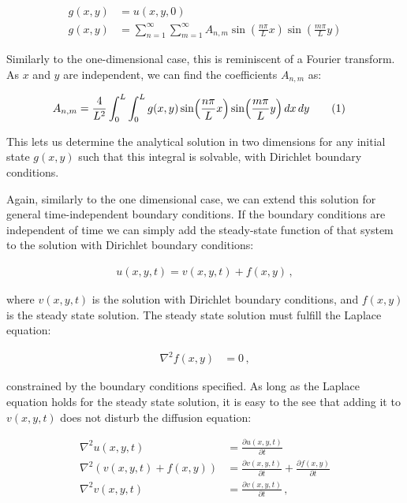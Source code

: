 \documentclass[reprint,english,notitlepage]{revtex4-1}  %
\newcommand\numberthis{\addtocounter{equation}{1}\tag{\theequation}}
\begin{document}
\begin{align*}
g(x,y) &= u(x,y,0) \\
g(x,y) &= \sum\limits_{n=1}^\infty \sum\limits_{m=1}^\infty A_{n,m} \sin (\frac{n\pi}{L} x)  \sin (\frac{m\pi}{L} y)
\end{align*}

Similarly to the one-dimensional case, this is reminiscent of a Fourier transform. As $x$ and $y$ are independent, we can find the coefficients $A_{n,m}$ as:

\begin{align*}
A_{n,m} &= \frac{4}{L^2} \int_0^L \int_0^L g(x,y) \sin( \frac{n\pi}{L} x) \sin (\frac{m\pi}{L} y) \, dx \, dy \numberthis \label{eq:2D_diffusion_equation_analytical_coefficients}
\end{align*}

This lets us determine the analytical solution in two dimensions for any initial state $g(x,y)$ such that this integral is solvable, with Dirichlet boundary conditions.

Again, similarly to the one dimensional case, we can extend this solution for general time-independent boundary conditions. If the boundary conditions are independent of time we can simply add the steady-state function of that system to the solution with Dirichlet boundary conditions:

\begin{align*}
u(x,y,t) = v(x,y,t) + f(x,y) \, ,
\end{align*}

where $v(x,y,t)$ is the solution with Dirichlet boundary conditions, and $f(x,y)$ is the steady state solution. The steady state solution must fulfill the Laplace equation:

\begin{align*}
\nabla^2 f(x,y) &= 0 \, ,
\end{align*}

constrained by the boundary conditions specified. As long as the Laplace equation holds for the steady state solution, it is easy to the see that adding it to $v(x,y,t)$ does not disturb the diffusion equation:

\begin{align*}
\nabla^2 u(x,y,t) &= \frac{\partial u(x,y,t)}{\partial t} \\
\nabla^2 (v(x,y,t) + f(x,y) ) &= \frac{\partial v(x,y,t)}{\partial t} + \frac{\partial f(x,y)}{\partial t} \\
\nabla^2 v(x,y,t) &= \frac{\partial v(x,y,t)}{\partial t} \, ,
\end{align*}
\end{document}
